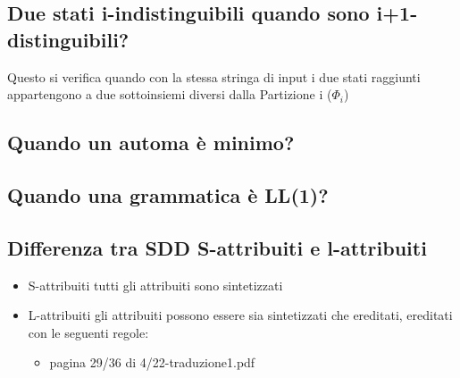 \documentclass[14pt]{extarticle}
\begin{document}
\subsection{Due stati i-indistinguibili quando sono i+1-distinguibili?}
Questo si verifica quando con la stessa stringa di input i due stati raggiunti appartengono a due sottoinsiemi diversi dalla Partizione i ($\Phi_i$)
\subsection{Quando un automa è minimo?}
\subsection{Quando una grammatica è LL(1)?}
\subsection{Differenza tra SDD S-attribuiti e l-attribuiti}
\begin{itemize}
    \item S-attribuiti tutti gli attribuiti sono sintetizzati
    \item L-attribuiti gli attribuiti possono essere sia sintetizzati che ereditati, ereditati con le seguenti regole:
    \begin{itemize}
        \item pagina 29/36 di 4/22-traduzione1.pdf
    \end{itemize}
\end{itemize}
\end{document}
